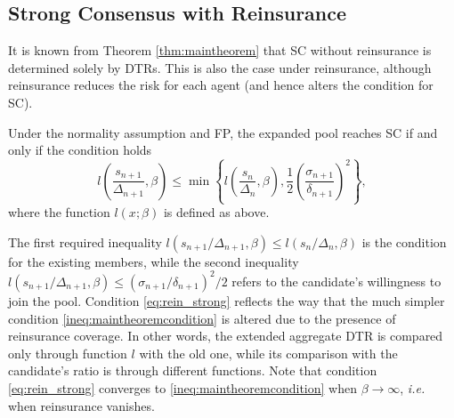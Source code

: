 \documentclass[fleqn,mnsc,nonblindrev]{informs4}
\begin{document}
\subsection{Strong Consensus with Reinsurance}\label{sec:existingreinsu}
It is known from Theorem \ref{thm:maintheorem} that SC without reinsurance is determined solely by DTRs. This is also the case under reinsurance, although reinsurance reduces the risk for each agent (and hence alters   {the condition for SC}).
\begin{theorem}\label{thm:rein_strong}
Under the normality assumption and FP, the expanded pool reaches SC if and only if the condition holds 
\begin{equation}\label{eq:rein_strong}
l\left(\frac{s_{n+1}}{\Delta_{n+1}},\beta\right)\leq \min\left\{l\left(\frac{s_{n}}{\Delta_{n}},\beta\right),\frac{1}{2}\left(\frac{\sigma_{n+1}}{\delta_{n+1}}\right)^2\right\},
\end{equation}
where the function   {$l(x;\beta)$ is defined as above.}
\end{theorem}
The first required inequality $l(s_{n+1}/\Delta_{n+1},\beta)\leq l(s_{n}/\Delta_{n},\beta)$ is the condition for the existing members, while the second inequality $l(s_{n+1}/\Delta_{n+1},\beta)\leq (\sigma_{n+1}/\delta_{n+1})^2/2$ refers to the candidate's willingness to join the pool. Condition \eqref{eq:rein_strong} reflects the way that the much simpler condition \eqref{ineq:maintheoremcondition} is altered due to the presence of reinsurance coverage. In other words, the extended aggregate DTR is compared only through function $l$ with the old one, while its comparison with the candidate's ratio is through different functions. Note that condition \eqref{eq:rein_strong} converges to \eqref{ineq:maintheoremcondition} when $\beta\to\infty$, {\it i.e.} when reinsurance vanishes. 
\end{document}
